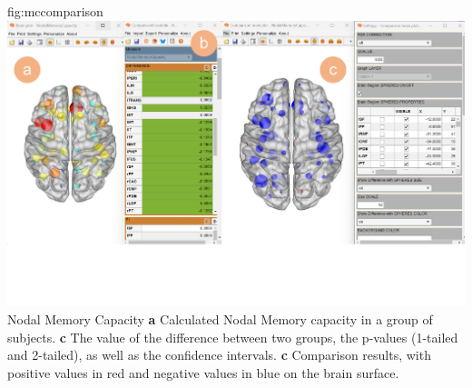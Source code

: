 \documentclass{tufte-handout}
\begin{document}
	{fig:mccomparison}
	{\includegraphics{fig09.jpg}}
	{Nodal Memory Capacity}
	{
	{\bf a} Calculated Nodal Memory capacity in a group of subjects.
	{\bf c} The value of the difference between two groups, the p-values (1-tailed and 2-tailed), as well as the confidence intervals. 
	{\bf c} Comparison results, with positive values in red and negative values in blue on the brain surface.
	}

\end{document}
